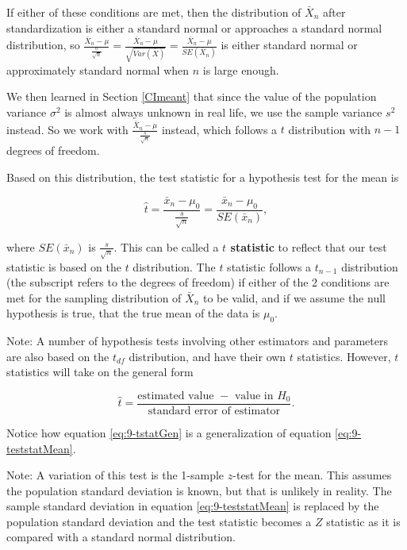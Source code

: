 \documentclass[
]{book}
\theoremstyle{definition}
\theoremstyle{definition}
\theoremstyle{definition}
\theoremstyle{definition}
\theoremstyle{remark}
\begin{document}
If either of these conditions are met, then the distribution of \(\bar{X}_n\) after standardization is either a standard normal or approaches a standard normal distribution, so \(\frac{\bar{X}_n - \mu}{\frac{\sigma}{\sqrt{n}}} = \frac{\bar{X}_n - \mu}{\sqrt{Var(\bar{X})}} = \frac{\bar{X}_n - \mu}{SE(\bar{X}_n)}\) is either standard normal or approximately standard normal when \(n\) is large enough.

We then learned in Section \ref{CImeant} that since the value of the population variance \(\sigma^2\) is almost always unknown in real life, we use the sample variance \(s^2\) instead. So we work with \(\frac{\bar{X}_n - \mu}{\frac{s}{\sqrt{n}}}\) instead, which follows a \(t\) distribution with \(n-1\) degrees of freedom.

Based on this distribution, the test statistic for a hypothesis test for the mean is

\begin{equation} 
\hat{t} =  \frac{\bar{x}_n - \mu_0}{\frac{s}{\sqrt{n}}} = \frac{\bar{x}_n - \mu_0}{SE(\bar{x}_n)},
\label{eq:9-teststatMean}
\end{equation}

where \(SE(\bar{x}_n)\) is \(\frac{s}{\sqrt{n}}\). This can be called a \textbf{\(t\) statistic} to reflect that our test statistic is based on the \(t\) distribution. The \(t\) statistic follows a \(t_{n-1}\) distribution (the subscript refers to the degrees of freedom) if either of the 2 conditions are met for the sampling distribution of \(\bar{X}_n\) to be valid, and if we assume the null hypothesis is true, that the true mean of the data is \(\mu_0\).

Note: A number of hypothesis tests involving other estimators and parameters are also based on the \(t_{df}\) distribution, and have their own \(t\) statistics. However, \(t\) statistics will take on the general form

\begin{equation} 
\hat{t} =  \frac{\text{estimated value }- \text{ value in } H_0}{\text{standard error of estimator}}.
\label{eq:9-tstatGen}
\end{equation}

Notice how equation \eqref{eq:9-tstatGen} is a generalization of equation \eqref{eq:9-teststatMean}.

Note: A variation of this test is the 1-sample \(z\)-test for the mean. This assumes the population standard deviation is known, but that is unlikely in reality. The sample standard deviation in equation \eqref{eq:9-teststatMean} is replaced by the population standard deviation and the test statistic becomes a \(Z\) statistic as it is compared with a standard normal distribution.
\end{document}
